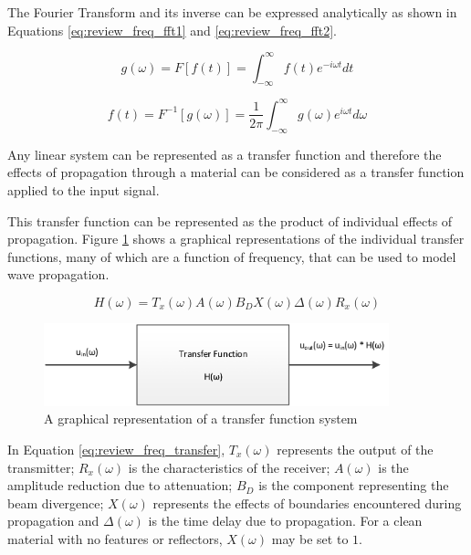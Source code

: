 The Fourier Transform and its inverse can be expressed analytically as shown in Equations \ref{eq:review_freq_fft1} and \ref{eq:review_freq_fft2}.

\begin{equation} \label{eq:review_freq_fft1}
g(\omega) = F[f(t)] =  \int_{-\infty}^\infty f(t)e^{-i\omega t} dt
\end{equation}

\begin{equation} \label{eq:review_freq_fft2}
f(t) = F^{-1}[g(\omega)] = \frac{1}{2\pi} \int_{-\infty}^\infty g(\omega)e^{i\omega t} d\omega
\end{equation}

Any linear system can be represented as a transfer function and therefore the effects of propagation through a material can be considered as a transfer function applied to the input signal.

This transfer function can be represented as the product of individual effects of propagation. Figure \ref{fig:review_transfer} shows a graphical representations of the individual transfer functions, many of which are a function of frequency, that can be used to model wave propagation.

\begin{equation} \label{eq:review_freq_transfer}
H(\omega) = T_x(\omega) A(\omega) B_D X(\omega) \Delta(\omega) R_x(\omega)
\end{equation}

\begin{figure}[!ht]
\centering
		\includegraphics[width=10cm]{FreqSystem2.png}
		\caption{A graphical representation of a transfer function system}
		\label{fig:review_transfer}
\end{figure}

In Equation \ref{eq:review_freq_transfer}\cite{university_of_bristol_frequency_2011}, $T_x(\omega)$ represents the output of the transmitter; $R_x(\omega)$ is the characteristics of the receiver; $A(\omega)$ is the amplitude reduction due to attenuation; $B_D$ is the component representing the beam divergence; $X(\omega)$ represents the effects of boundaries encountered during propagation and $\Delta(\omega)$ is the time delay due to propagation. For a clean material with no features or reflectors, $X(\omega)$ may be set to $1$.

